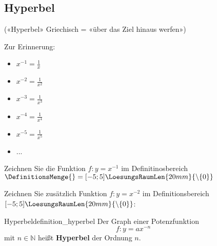 
\subsection{Hyperbel}

(«Hyperbel» Griechisch = «über das Ziel hinaus werfen»)


Zur Erinnerung:
\begin{multicols}{2}
\begin{itemize}
	\item $x^{-1} = \frac{1}{x}$
	\item $x^{-2} = \frac{1}{x^2}$
	\item $x^{-3} = \frac{1}{x^3}$
	\item $x^{-4} = \frac{1}{x^4}$
	\item $x^{-5} = \frac{1}{x^5}$
  \item ...
\end{itemize}
\end{multicols}

Zeichnen Sie die Funktion $f: y = x^{-1}$ im Definitinosbereich
$\DefinitionsMenge{} = [-5;5]\LoesungsRaumLen{20mm}{\backslash \{0\}}$


\newpage


Zeichnen Sie zusätzlich Funktion $f: y = x^{-2}$ im Definitionsbereich
$[-5;5]\LoesungsRaumLen{20mm}{\backslash \{0\}}$:


\begin{definition}{Hyperbel}{definition_hyperbel}
  Der Graph einer Potenzfunktion $$f: y=ax^{-n}$$
  mit $n \in \mathbb{N}$ heißt
\textbf{Hyperbel} der Ordnung $n$.
\end{definition}

